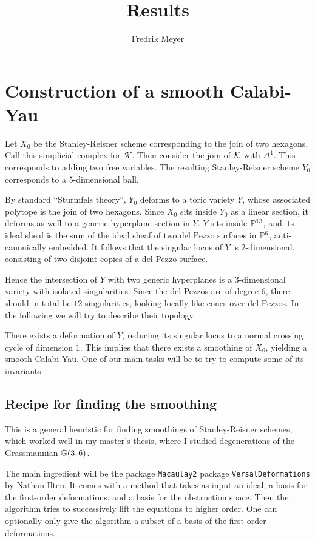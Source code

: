 \documentclass[11pt, english]{article}
\begin{document}
\title{Results}
\author{Fredrik Meyer}
\maketitle 

\section{Construction of a smooth Calabi-Yau}

Let $X_0$ be the Stanley-Reisner scheme corresponding to the join of two hexagons. Call this simplicial complex for $\mathcal K$. Then consider the join of $\mathcal K$ with $\Delta^1$. This corresponds to adding two free variables. The resulting Stanley-Reisner scheme $Y_0$ corresponds to a $5$-dimensional ball. 

By standard ``Sturmfels theory'', $Y_0$ deforms to a toric variety $Y$, whose associated polytope is the join of two hexagons. Since $X_0$ sits inside $Y_0$ as a linear section, it deforms as well to a generic hyperplane section in $Y$. $Y$ sits inside $\mathbb{P}^{13}$, and its ideal sheaf is the sum of the ideal sheaf of two del Pezzo surfaces in $\mathbb{P}^6$, anti-canonically embedded. It follows that the singular locus of $Y$ is $2$-dimensional, consisting of two disjoint copies of a del Pezzo surface. 

Hence the intersection of $Y$ with two generic hyperplanes is a 3-dimensional variety with isolated singularities. Since the del Pezzos are of degree $6$, there should in total be $12$ singularities, looking locally like cones over del Pezzos. In the following we will try to describe their topology.

There exists a deformation of $Y$, reducing its singular locus to a normal crossing cycle of dimension $1$. This implies that there exists a smoothing of $X_0$, yielding a smooth Calabi-Yau. One of our main tasks will be to try to compute some of its invariants.

\subsection{Recipe for finding the smoothing}

This is a general heuristic for finding smoothings of Stanley-Reisner schemes, which worked well in my master's thesis, where I studied degenerations of the Grassmannian $\mathbb{G}(3,6)$.

The main ingredient will be the package \texttt{Macaulay2} package \texttt{VersalDeformations} by Nathan Ilten. It comes with a method that takes as input an ideal, a basis for the first-order deformations, and a basis for the obstruction space. Then the algorithm tries to successively lift the equations to higher order. One can optionally only give the algorithm a subset of a basis of the first-order deformations. 
\end{document}
